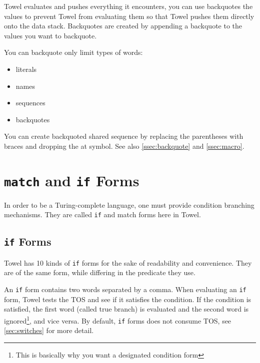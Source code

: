 \documentclass{book}
\begin{document}
Towel evaluates and pushes everything it encounters, you can use backquotes the values to prevent Towel from evaluating them so that Towel pushes them directly onto the data stack. Backquotes are created by appending a backquote to the values you want to backquote.

You can backquote only limit types of words:
\begin{itemize}
\item literals
\item names
\item sequences
\item backquotes
\end{itemize}

You can create backquoted shared sequence by replacing the parentheses with braces and dropping the at symbol. See also \autoref{ssec:backquote} and \autoref{ssec:macro}.

\section{\texttt{match} and \texttt{if} Forms}

In order to be a Turing-complete language, one must provide condition branching mechanisms. They are called \texttt{if} and match forms here in Towel.

\subsection{\texttt{if} Forms}

Towel has 10 kinds of \texttt{if} forms for the sake of readability and convenience. They are of the same form, while differing in the predicate they use.

An \texttt{if} form contains two words separated by a comma. When evaluating an \texttt{if} form, Towel tests the TOS and see if it satisfies the condition. If the condition is satisfied, the first word (called true branch) is evaluated and the second word is ignored\footnote{This is basically why you want a designated condition form}, and vice versa. By default, \texttt{if} forms does not consume TOS, see \autoref{sec:switches} for more detail.
\end{document}

